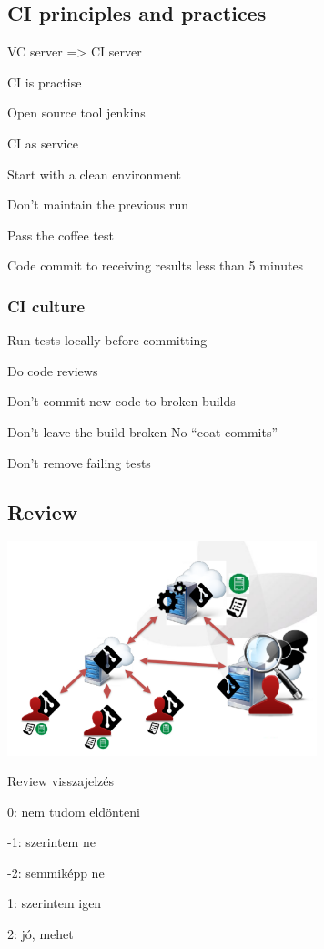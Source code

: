 \documentclass[a4paper,14pt, twocolumn]{extarticle}
\begin{document}
		\subsection{CI principles and practices}
		\begin{compactitem}
			\item VC server => CI server
			\item CI is practise
			\item Open source tool jenkins
			\item CI as service
			\item Start with a clean environment 
			\begin{compactitem}
				\item  Don’t maintain the previous run 
			\end{compactitem}
			\item Pass the coffee test 
			\begin{compactitem}
				\item  Code commit to receiving results less than 5 minutes
			\end{compactitem}
		\end{compactitem}
			\subsubsection{CI culture} 
				\begin{compactitem}
					\item  Run tests locally before committing
					\item Do code reviews 
					\item Don’t commit new code to broken builds 
					\item Don’t leave the build broken No “coat commits”
					\item Don’t remove failing tests
				\end{compactitem}
		\subsection{Review}
			\begin{center}
				\includegraphics[width=9cm]{rev}
			\end{center}
			Review visszajelzés
			\begin{compactitem}
				\item 0: nem tudom eldönteni
				\item -1: szerintem ne
				\item -2: semmiképp ne
				\item 1: szerintem igen
				\item 2: jó, mehet	
			\end{compactitem}
		\newpage
\end{document}

